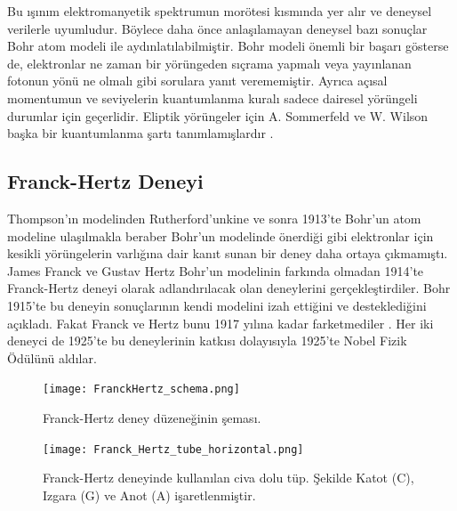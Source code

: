 \documentclass[a4paper,12pt, twoside]{article}
\begin{document}
Bu ışınım elektromanyetik spektrumun morötesi kısmında yer alır ve deneysel verilerle uyumludur. Böylece daha önce anlaşılamayan deneysel bazı sonuçlar Bohr atom modeli ile aydınlatılabilmiştir. Bohr modeli önemli bir başarı gösterse de, elektronlar ne zaman bir yörüngeden sıçrama yapmalı veya yayınlanan fotonun yönü ne olmalı gibi sorulara yanıt verememiştir. Ayrıca açısal momentumun ve seviyelerin kuantumlanma kuralı sadece dairesel yörüngeli durumlar için geçerlidir. Eliptik yörüngeler için A. Sommerfeld ve W. Wilson başka bir kuantumlanma şartı tanımlamışlardır \cite{book:Gasiorowicz, book:EisbergResnick}. 


\subsection{Franck-Hertz Deneyi}
\vspace{12pt}



Thompson'ın modelinden Rutherford'unkine ve sonra 1913'te Bohr'un atom modeline ulaşılmakla beraber Bohr'un modelinde önerdiği gibi elektronlar için kesikli yörüngelerin varlığına dair kanıt sunan bir deney daha ortaya çıkmamıştı. James Franck ve Gustav Hertz Bohr'un modelinin farkında olmadan 1914'te  Franck-Hertz deneyi olarak adlandırılacak olan deneylerini gerçekleştirdiler. Bohr 1915'te bu deneyin sonuçlarının kendi modelini izah ettiğini ve desteklediğini açıkladı. Fakat Franck ve Hertz bunu 1917 yılına kadar farketmediler \cite{book:Greenberger}. Her iki deneyci de 1925'te bu deneylerinin katkısı dolayısıyla 1925'te Nobel Fizik Ödülünü aldılar.

\begin{figure}[hbtp]
	\center
	\begin{minipage}{.3\textwidth}
		\center
		\texttt{[image: FranckHertz\_schema.png]}
		\caption{Franck-Hertz deney düzeneğinin şeması.}
		\label{fig:franck_hertz_schema}
	\end{minipage}
	\hspace{12pt}
	\begin{minipage}{.48\textwidth}
		\center
		\vspace{12pt}
		\texttt{[image: Franck\_Hertz\_tube\_horizontal.png]}
		\vspace{6pt}
		\caption{Franck-Hertz deneyinde kullanılan civa dolu tüp. Şekilde Katot (C), Izgara (G) ve Anot (A) işaretlenmiştir.}
		\label{fig:franck_hertz_tube}
	\end{minipage}
\end{figure}
\end{document}
